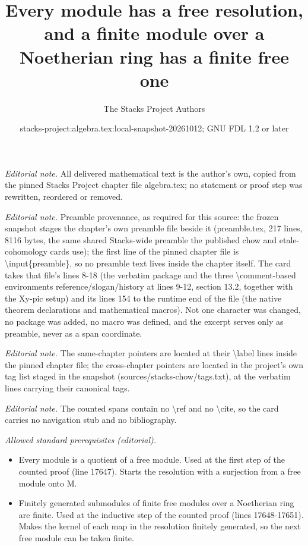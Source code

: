 \documentclass[10pt,a4paper]{amsart}
\title{Every module has a free resolution, and a finite module over a Noetherian ring has a finite free one}
\author{The Stacks Project Authors}
\date{stacks-project:algebra.tex:local-snapshot-20261012; GNU FDL 1.2 or later}
\theoremstyle{plain}
\theoremstyle{definition}
\theoremstyle{remark}
\numberwithin{equation}{subsection}
\begin{document}
\maketitle
\noindent\textit{Editorial note.} All delivered mathematical text is the author's own, copied from the pinned Stacks Project chapter file algebra.tex; no statement or proof step was rewritten, reordered or removed.\par\medskip
\noindent\textit{Editorial note.} Preamble provenance, as required for this source: the frozen snapshot stages the chapter's own preamble file beside it (preamble.tex, 217 lines, 8116 bytes, the same shared Stacks-wide preamble the published chow and etale-cohomology cards use); the first line of the pinned chapter file is \textbackslash{}input\{preamble\}, so no preamble text lives inside the chapter itself. The card takes that file's lines 8-18 (the verbatim package and the three \textbackslash{}comment-based environments reference/slogan/history at lines 9-12, section 13.2, together with the Xy-pic setup) and its lines 154 to the runtime end of the file (the native theorem declarations and mathematical macros). Not one character was changed, no package was added, no macro was defined, and the excerpt serves only as preamble, never as a span coordinate.\par\medskip
\noindent\textit{Editorial note.} The same-chapter pointers are located at their \textbackslash{}label lines inside the pinned chapter file; the cross-chapter pointers are located in the project's own tag list staged in the snapshot (sources/stacks-chow/tags.txt), at the verbatim lines carrying their canonical tags.\par\medskip
\noindent\textit{Editorial note.} The counted spans contain no \textbackslash{}ref and no \textbackslash{}cite, so the card carries no navigation stub and no bibliography.\par\medskip
\noindent\textit{Allowed standard prerequisites (editorial).}\begin{itemize}
\item Every module is a quotient of a free module. Used at the first step of the counted proof (line 17647). Starts the resolution with a surjection from a free module onto M.
\item Finitely generated submodules of finite free modules over a Noetherian ring are finite. Used at the inductive step of the counted proof (lines 17648-17651). Makes the kernel of each map in the resolution finitely generated, so the next free module can be taken finite.
\end{itemize}\medskip
\end{document}
